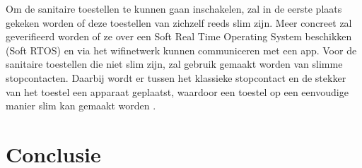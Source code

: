  Om de sanitaire toestellen te kunnen gaan inschakelen, zal in de eerste plaats gekeken worden of deze toestellen van zichzelf reeds slim zijn. Meer concreet zal geverifieerd worden of ze over een Soft Real Time Operating System beschikken (Soft RTOS) en via het wifinetwerk kunnen communiceren met een app. Voor de sanitaire toestellen die niet slim zijn, zal gebruik gemaakt worden van slimme stopcontacten. Daarbij wordt er tussen het klassieke stopcontact en de stekker van het toestel een apparaat geplaatst, waardoor een toestel op een eenvoudige manier slim kan gemaakt worden \autocite{Jong2020}.

\chapter{Conclusie}%
\label{ch:Conclusie}